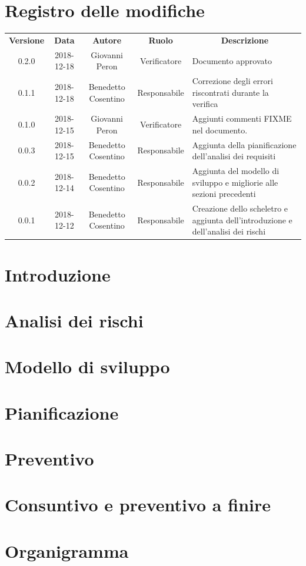\documentclass[11pt,a4paper]{article}
\begin{document}
	
	
	\newpage
	\section*{\centering Registro delle modifiche}
	\begin{tabularx}{\textwidth}{ c | c | c | c | X }
		\rowcolor{LightBlue}
		\color{white}\bfseries Versione & \color{white}\bfseries Data & \color{white}\bfseries Autore & \color{white}\bfseries Ruolo & \multicolumn{1}{c}{\color{white}\bfseries Descrizione}\\[0.25cm]
		0.2.0 & 2018-12-18 & Giovanni Peron & Verificatore & Documento approvato\\
		0.1.1 & 2018-12-18 & Benedetto Cosentino & Responsabile & Correzione degli errori riscontrati durante la verifica\\
		0.1.0 & 2018-12-15 & Giovanni Peron & Verificatore & Aggiunti commenti FIXME nel documento.\\
		0.0.3 & 2018-12-15 & Benedetto Cosentino & Responsabile & Aggiunta della pianificazione dell'analisi dei requisiti\\
		0.0.2 & 2018-12-14 & Benedetto Cosentino & Responsabile & Aggiunta del modello di sviluppo e migliorie alle sezioni precedenti\\
		0.0.1 & 2018-12-12 & Benedetto Cosentino & Responsabile & Creazione dello scheletro e aggiunta dell'introduzione e dell'analisi dei rischi\\
	\end{tabularx}
	\newpage
	\tableofcontents
	\newpage	
	\section{Introduzione}
			
		\newpage	
	
	\section{Analisi dei rischi}
		
		\newpage	

	\section{Modello di sviluppo}
		
		\newpage	

	\section{Pianificazione}
		
		
	\section{Preventivo}
%		
		
	\section{Consuntivo e preventivo a finire}
%		

	\appendix
	\section{Organigramma}
%		
\end{document}
